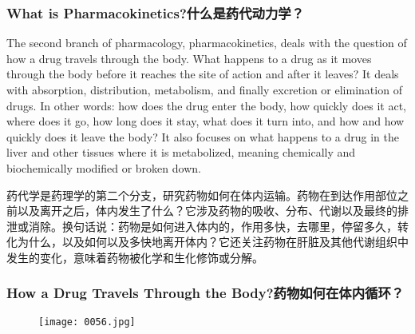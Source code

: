 \documentclass[dvipsnames, svgnames,a4paper,11pt]{article}
\begin{document}
\subsubsection{What is Pharmacokinetics?什么是药代动力学？}

The second branch of pharmacology, pharmacokinetics, deals with the question of how a drug travels through the body. What happens to a drug as it moves through the body before it reaches the site of action and after it leaves? It deals with absorption, distribution, metabolism, and finally excretion or elimination of drugs. In other words: how does the drug enter the body, how quickly does it act, where does it go, how long does it stay, what does it turn into, and how and how quickly does it leave the body? It also focuses on what happens to a drug in the liver and other tissues where it is metabolized, meaning chemically and biochemically modified or broken down.

药代学是药理学的第二个分支，研究药物如何在体内运输。药物在到达作用部位之前以及离开之后，体内发生了什么？它涉及药物的吸收、分布、代谢以及最终的排泄或消除。换句话说：药物是如何进入体内的，作用多快，去哪里，停留多久，转化为什么，以及如何以及多快地离开体内？它还关注药物在肝脏及其他代谢组织中发生的变化，意味着药物被化学和生化修饰或分解。

\subsubsection{How a Drug Travels Through the Body?药物如何在体内循环？}

\begin{figure}[ht]
    \centering
    \texttt{[image: 0056.jpg]}
     \label{fig47}
\end{figure}
\end{document}
